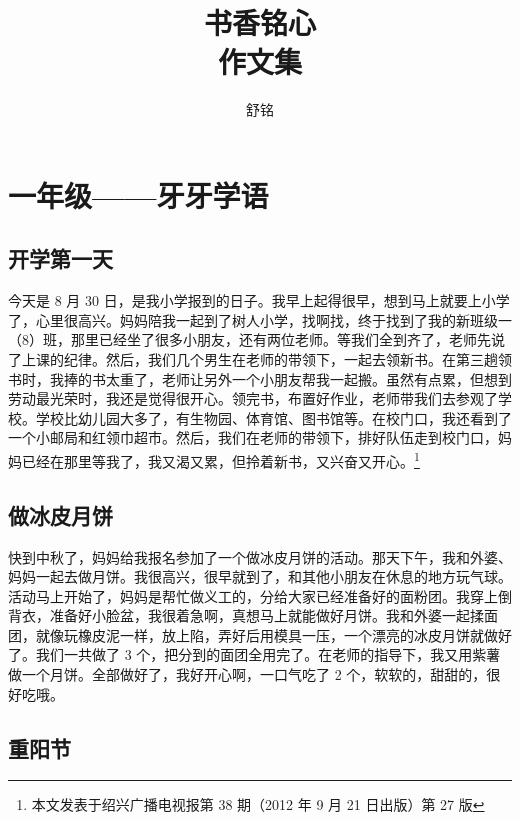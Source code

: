 \documentclass[UTF8,a4paper,titlepage,twoside,10.5pt]{article}
\author{\zihao{2} 舒铭}
\date{}
\title{\zihao{0} \textbf{书香铭心}\\\medskip
\large \zihao{1} 作文集}
\begin{document}
\maketitle
\tableofcontents

\pagestyle{headings}
\newpage
\pagestyle{fancy}
\fancyhf{}
\fancyhead[LE,RO]{\leftmark}
\fancyfoot[LE,RO]{\thepage}
\setcounter{page}{1}

\section{一年级——牙牙学语}
\label{sec:org30159d1}

\subsection{开学第一天}
\label{sec:org2db7242}

今天是 8 月 30 日，是我小学报到的日子。我早上起得很早，想到马上就要上小学了，心里很高兴。妈妈陪我一起到了树人小学，找啊找，终于找到了我的新班级一（8）班，那里已经坐了很多小朋友，还有两位老师。等我们全到齐了，老师先说了上课的纪律。然后，我们几个男生在老师的带领下，一起去领新书。在第三趟领书时，我捧的书太重了，老师让另外一个小朋友帮我一起搬。虽然有点累，但想到劳动最光荣时，我还是觉得很开心。领完书，布置好作业，老师带我们去参观了学校。学校比幼儿园大多了，有生物园、体育馆、图书馆等。在校门口，我还看到了一个小邮局和红领巾超市。然后，我们在老师的带领下，排好队伍走到校门口，妈妈已经在那里等我了，我又渴又累，但拎着新书，又兴奋又开心。\footnote{本文发表于绍兴广播电视报第 38 期（2012 年 9 月 21 日出版）第 27 版}

\subsection{做冰皮月饼}
\label{sec:orgb2d6cf7}

快到中秋了，妈妈给我报名参加了一个做冰皮月饼的活动。那天下午，我和外婆、妈妈一起去做月饼。我很高兴，很早就到了，和其他小朋友在休息的地方玩气球。活动马上开始了，妈妈是帮忙做义工的，分给大家已经准备好的面粉团。我穿上倒背衣，准备好小脸盆，我很着急啊，真想马上就能做好月饼。我和外婆一起揉面团，就像玩橡皮泥一样，放上陷，弄好后用模具一压，一个漂亮的冰皮月饼就做好了。我们一共做了 3 个，把分到的面团全用完了。在老师的指导下，我又用紫薯做一个月饼。全部做好了，我好开心啊，一口气吃了 2 个，软软的，甜甜的，很好吃哦。

\subsection{重阳节}
\label{sec:org2b0d822}
\end{document}

